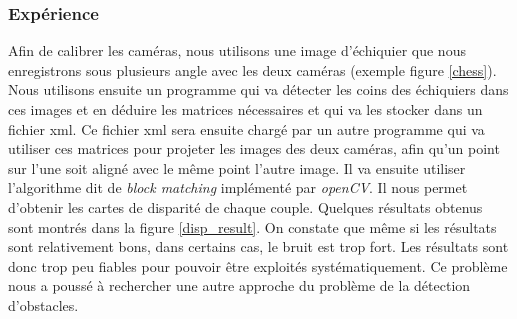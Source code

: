 \documentclass{article}
\begin{document}
\subsubsection{Expérience} Afin de calibrer les caméras, nous utilisons une image d'échiquier que nous enregistrons sous plusieurs angle avec les deux caméras (exemple figure \ref{chess}). Nous utilisons ensuite un programme qui va détecter les coins des échiquiers dans ces images et en déduire les matrices nécessaires et qui va les stocker dans un fichier xml. Ce fichier xml sera ensuite chargé par un autre programme qui va utiliser ces matrices pour projeter les images des deux caméras, afin qu'un point sur l'une soit aligné avec le même point l'autre image. Il va ensuite utiliser l'algorithme dit de \emph{block matching} implémenté par \emph{openCV}. Il nous permet d'obtenir les cartes de disparité de chaque couple. Quelques résultats obtenus sont montrés dans la figure \ref{disp_result}. On constate que même si les résultats sont relativement bons, dans certains cas, le bruit est trop fort. Les résultats sont donc trop peu fiables pour pouvoir être exploités systématiquement. Ce problème nous a poussé à rechercher une autre approche du problème de la détection d'obstacles.
\end{document}
